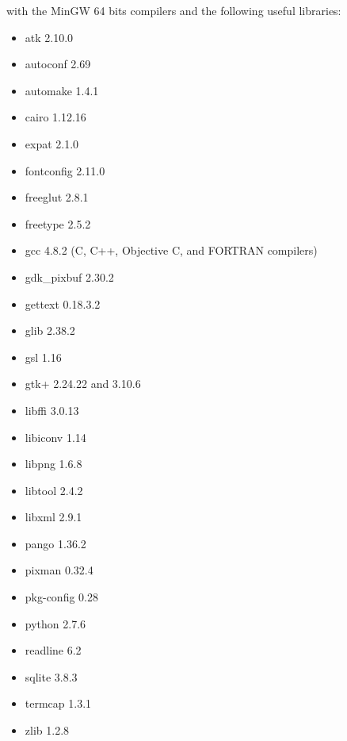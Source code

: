 \documentclass[a4paper]{article}
\begin{document}
with the MinGW 64 bits compilers and the following useful libraries:
\begin{itemize}
\item atk 2.10.0
\item autoconf 2.69
\item automake 1.4.1
\item cairo 1.12.16
\item expat 2.1.0
\item fontconfig 2.11.0
\item freeglut 2.8.1
\item freetype 2.5.2
\item gcc 4.8.2 (C, C++, Objective C, and FORTRAN compilers)
\item gdk\_pixbuf 2.30.2
\item gettext 0.18.3.2
\item glib 2.38.2
\item gsl 1.16
\item gtk+ 2.24.22 and 3.10.6
\item libffi 3.0.13
\item libiconv 1.14
\item libpng 1.6.8
\item libtool 2.4.2
\item libxml 2.9.1
\item pango 1.36.2
\item pixman 0.32.4
\item pkg-config 0.28
\item python 2.7.6
\item readline 6.2
\item sqlite 3.8.3
\item termcap 1.3.1
\item zlib 1.2.8
\end{itemize}
\end{document}
